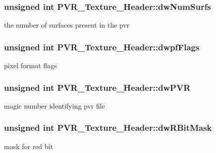 \subsubsection[{\texorpdfstring{dw\+Num\+Surfs}{dwNumSurfs}}]{\setlength{\rightskip}{0pt plus 5cm}unsigned int P\+V\+R\+\_\+\+Texture\+\_\+\+Header\+::dw\+Num\+Surfs}\hypertarget{struct_p_v_r___texture___header_ab5a48ebff7ae60e21b335fb7f8d1c2e3}{}\label{struct_p_v_r___texture___header_ab5a48ebff7ae60e21b335fb7f8d1c2e3}
the number of surfaces present in the pvr 
\subsubsection[{\texorpdfstring{dwpf\+Flags}{dwpfFlags}}]{\setlength{\rightskip}{0pt plus 5cm}unsigned int P\+V\+R\+\_\+\+Texture\+\_\+\+Header\+::dwpf\+Flags}\hypertarget{struct_p_v_r___texture___header_ab89dc74cf18383d2d41397e2e839faeb}{}\label{struct_p_v_r___texture___header_ab89dc74cf18383d2d41397e2e839faeb}
pixel format flags 
\subsubsection[{\texorpdfstring{dw\+P\+VR}{dwPVR}}]{\setlength{\rightskip}{0pt plus 5cm}unsigned int P\+V\+R\+\_\+\+Texture\+\_\+\+Header\+::dw\+P\+VR}\hypertarget{struct_p_v_r___texture___header_a1aa3e8921cb7576374622129a952dd72}{}\label{struct_p_v_r___texture___header_a1aa3e8921cb7576374622129a952dd72}
magic number identifying pvr file 
\subsubsection[{\texorpdfstring{dw\+R\+Bit\+Mask}{dwRBitMask}}]{\setlength{\rightskip}{0pt plus 5cm}unsigned int P\+V\+R\+\_\+\+Texture\+\_\+\+Header\+::dw\+R\+Bit\+Mask}\hypertarget{struct_p_v_r___texture___header_a94f02eef9ff95c18c3922ce84b3e59da}{}\label{struct_p_v_r___texture___header_a94f02eef9ff95c18c3922ce84b3e59da}
mask for red bit 

